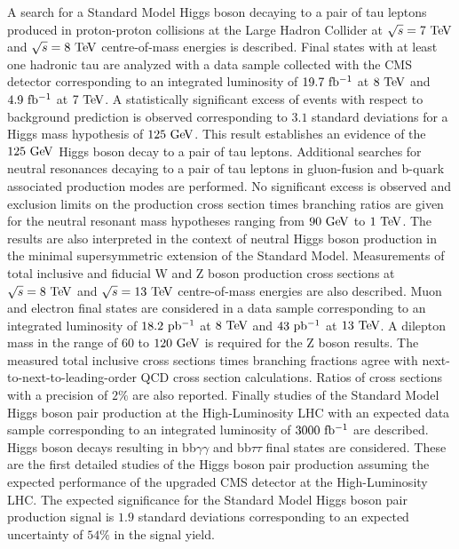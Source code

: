 % 
% 
%


A search for a Standard Model Higgs boson decaying to a pair of tau leptons produced in proton-proton collisions at the Large Hadron Collider at $\sqrt{s}=7~\mathrm{Te\kern -0.1em V}$ and $\sqrt{s}=8~\mathrm{Te\kern -0.1em V}$ centre-of-mass energies is described. Final states with at least one hadronic tau are analyzed with a data sample collected with the CMS detector corresponding to an integrated luminosity of $19.7~\mathrm{fb^{-1}}$ at $8~\mathrm{Te\kern -0.1em V}$ and $4.9~\mathrm{fb^{-1}}$ at $7~\mathrm{Te\kern -0.1em V}$. A statistically significant excess of events with respect to background prediction is observed corresponding to $3.1$ standard deviations for a Higgs mass hypothesis of $125~\mathrm{Ge\kern -0.1em V}$. This result establishes an evidence of the $125~\mathrm{Ge\kern -0.1em V}$ Higgs boson decay to a pair of tau leptons. Additional searches for neutral resonances decaying to a pair of tau leptons in gluon-fusion and b-quark associated production modes are performed. No significant excess is observed and exclusion limits on the production cross section times branching ratios are given for the neutral resonant mass hypotheses ranging from $90~\mathrm{Ge\kern -0.1em V}$ to $1~\mathrm{Te\kern -0.1em V}$. The results are also interpreted in the context of neutral Higgs boson production in the minimal supersymmetric extension of the Standard Model. Measurements of total inclusive and fiducial W and Z boson production cross sections at $\sqrt{s}=8~\mathrm{Te\kern -0.1em V}$  and $\sqrt{s}=13~\mathrm{Te\kern -0.1em V}$ centre-of-mass energies are also described. Muon and electron final states are considered in a data sample corresponding to an integrated luminosity of $18.2~\mathrm{pb^{-1}}$ at $8~\mathrm{Te\kern -0.1em V}$ and $43~\mathrm{pb^{-1}}$ at $13~\mathrm{Te\kern -0.1em V}$. A dilepton mass in the range of $60$ to $120~\mathrm{Ge\kern -0.1em V}$ is required for the Z boson results. The measured total inclusive cross sections times branching fractions agree with next-to-next-to-leading-order QCD cross section calculations. Ratios of cross sections with a precision of $2\%$ are also reported. Finally studies of the Standard Model Higgs boson pair production at the High-Luminosity LHC with an expected data sample corresponding to an integrated luminosity of $3000~\mathrm{fb^{-1}}$ are described. Higgs boson decays resulting in bb$\gamma\gamma$ and bb$\tau\tau$ final states are considered. These are the first detailed studies of the Higgs boson pair production assuming the expected performance of the upgraded CMS detector at the High-Luminosity LHC. The expected significance for the Standard Model Higgs boson pair production signal is $1.9$ standard deviations corresponding to an expected uncertainty of $54\%$ in the signal yield. 


